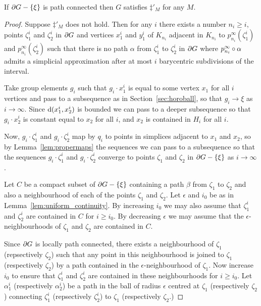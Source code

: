 \documentclass[a4paper]{article}
\begin{document}
\begin{proposition}
  If $\partial G - \left\{\xi\right\}$ is path connected then $G$ satisfies $\ddag'_M$
  for any $M$.
\end{proposition}

\begin{proof}
  Suppose $\ddag'_M$ does not hold. Then for any $i$ there exists a number $n_i
  \geq i$, points $\zeta_1^i$ and $\zeta_2^i$ in $\partial G$ and vertices
  $x_1^i$ and $y_1^i$ of $K_{n_i}$ adjacent in $K_{n_i}$ to
  $p^\infty_{n_i}(\zeta^i_1)$ and $p^\infty_{n_i}(\zeta^i_2)$ such that there
  is no path $\alpha$ from $\zeta_1^i$ to $\zeta_2^i$ in $\partial G$ where
  $p^\infty_{n_i}\circ\alpha$ admits a simplicial approximation after at
  most $i$ barycentric subdivisions of the interval.

  Take group elements $g_i$ such that $g_i\cdot x_1^i$ is equal to some vertex
  $x_1$ for all $i$ vertices and pass to a subsequence as in
  Section~\ref{sec:horoball}, so that $g_i\to\xi$ as $i \to\infty$. Since
  $\operatorname{d}(x_1^i, x_2^i)$ is bounded we can pass to a deeper subsequence so that
  $g_i\cdot x_2^i$ is constant equal to $x_2$ for all $i$, and $x_2$ is
  contained in $H_i$ for all $i$. 

  Now, $g_i\cdot \zeta_1^i$ and $g_i\cdot\zeta_2^i$ map by $q_i$ to points in
  simplices adjacent to $x_1$ and $x_2$, so by Lemma~\ref{lem:propermaps} the
  sequences we can pass to a subsequence so that the sequences $g_i\cdot
  \zeta_1^i$ and $g_i\cdot\zeta_2^i$ converge to points $\zeta_1$ and $\zeta_2$
  in $\partial G - \left\{\xi\right\}$ as $i \to \infty$.
  
  Let $C$ be a compact subset of $\partial G - \left\{\xi\right\}$ containing a path
  $\beta$ from $\zeta_1$ to $\zeta_2$ and also a neighbourhood of each of the
  points $\zeta_1$ and $\zeta_2$. Let $\epsilon$ and $i_0$ be as in
  Lemma~\ref{lem:uniform_continuity}. By increasing $i_0$ we may also assume
  that $\zeta_1^i$ and $\zeta_2^i$ are contained in $C$ for $i \geq i_0$. By
  decreasing $\epsilon$ we may assume that the $\epsilon$-neighbourhoods of
  $\zeta_1$ and $\zeta_2$ are contained in $C$.

  Since $\partial G$ is locally path connected, there exists a neighbourhood
  of $\zeta_1$ (repsectively $\zeta_2$) such that any point in this
  neighbourhood is joined to $\zeta_1$ (respectively $\zeta_2$) by a path
  contained in the $\epsilon$-neighbourhood of $\zeta_1$. Now increase $i_0$ to
  ensure that $\zeta_1^i$ and $\zeta_2^i$ are contained in these neighbourhoods
  for $i \geq i_0$. Let $\alpha_1^i$ (respectively $\alpha_2^i$) be a path in
  the ball of radius $\epsilon$ centred at $\zeta_1$ (respectively $\zeta_2$)
  connecting $\zeta_1^i$ (repsectively $\zeta_2^i$) to $\zeta_1$ (respectively
  $\zeta_2$.)


\end{proof}
\end{document}
